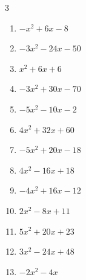\begin{multicols}{3}
\begin{enumerate}
  \item $-x^{2}+6x-8$


  \item $-3x^{2}-24x-50$


  \item $x^{2}+6x+6$


  \item $-3x^{2}+30x-70$


  \item $-5x^{2}-10x-2$


  \item $4x^{2}+32x+60$


  \item $-5x^{2}+20x-18$


  \item $4x^{2}-16x+18$


\columnbreak %

\resetques

  \item $-4x^{2}+16x-12$


  \item $2x^{2}-8x+11$


  \item $5x^{2}+20x+23$


  \item $3x^{2}-24x+48$


  \item $-2x^{2}-4x$



\end{enumerate}
\end{multicols}
